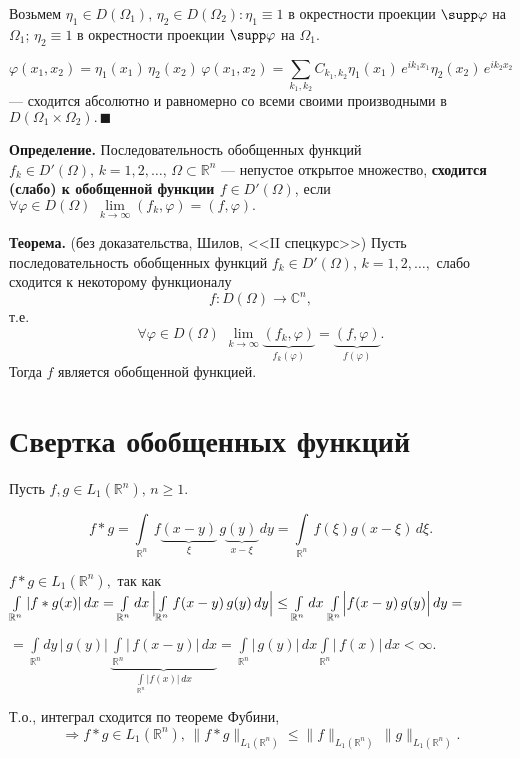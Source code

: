 \documentclass[12pt,a4paper,draft]{article}
\DeclareRobustCommand*{\т}{~--- }
\DeclareRobustCommand*{\ч}{~-- }
\begin{document}
Возьмем $\eta_1\in D(\Omega_1),\,\eta_2\in D(\Omega_2)\colon
\eta_1\equiv1$ в окрестности проекции $\supp \varphi$ на
$\Omega_1$; $\eta_2\equiv1$ в окрестности проекции $\supp \varphi$
на $\Omega_1$.

$$\varphi(x_1,x_2)=\eta_1(x_1)\,\eta_2(x_2)\,\varphi(x_1,x_2)=
\sum\limits_{k_1,k_2}C_{k_1,k_2}\eta_1(x_1)\,e^{ik_1x_1}\eta_2(x_2)\,e^{ik_2x_2}$$
 --- сходится абсолютно и равномерно со всеми своими производными в
$D(\Omega_1\times\Omega_2).\,\blacksquare$


\textbf{Определение.} Последовательность обобщенных функций
$f_k\in D'(\Omega),\,k=1,2,\ldots,\,\Omega\subset\mathbb R^n$ ---
непустое открытое множество, \textbf{сходится (слабо) к обобщенной
функции $f\in D'(\Omega)$}, если $\forall\varphi\in D(\Omega)\,\,
\lim\limits_{k\to\infty}(f_k,\varphi)=(f,\varphi).$

\textbf{Теорема.} (без доказательства, Шилов, <<II спецкурс>>) Пусть
последовательность обобщенных функций $f_k\in
D'(\Omega),\,k=1,2,\ldots,$ слабо сходится к некоторому
функционалу
$$f\colon D(\Omega)\to\mathbb C^n,$$
т.е.
$$\forall\varphi\in D(\Omega)\,\,
\lim\limits_{k\to\infty}\underbrace{(f_k,\varphi)}_{f_k(\varphi)}=
\underbrace{(f,\varphi)}_{f(\varphi)}.$$
Тогда $f$ является
обобщенной функцией.

\section{Свертка обобщенных функций}

Пусть $f,g\in L_1(\mathbb R^n),\,n\ge1.$

$$f*g=\int\limits_{\mathbb
R^n}\,f\underbrace{(x-y)}_{\xi}\,g\underbrace{(y)}_{x-\xi}\,dy=
\int\limits_{\mathbb R^n}\,f(\xi)g(x-\xi)\,d\xi.$$

$f*g\in L_1(\mathbb R^n),$ так как $\int\limits_{\mathbb R^n}
|f*g(x)|\,dx= \int\limits_{\mathbb R^n}dx\,
\Bigl|\int\limits_{\mathbb R^n}f(x-y)\,g(y)\,dy\Bigr|\le
\int\limits_{\mathbb R^n}dx\, \int\limits_{\mathbb
R^n}\Bigl|f(x-y)\,g(y)\Bigr|\,dy=$

$=\int\limits_{\mathbb
R^n}dy\,|\,g(y)|\,\underbrace{\int\limits_{\mathbb
R^n}|\,f(x-y)|\,dx}_{\int\limits_{\mathbb R^n}|f(x)|\,dx}=
\int\limits_{\mathbb R^n}|\,g(y)|\,dx\int\limits_{\mathbb
R^n}|\,f(x)|\,dx<\infty.$

Т.о., интеграл сходится по теореме Фубини,
$$\Rightarrow f*g\in
L_1(\mathbb R^n),\,\|f*g\|_{L_1(\mathbb R^n)}\le\|f\|_{L_1(\mathbb
R^n)}\,\|g\|_{L_1(\mathbb R^n)}.$$
\end{document}
